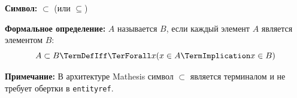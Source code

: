 

\hypertarget{axiom-subset}{}
\begin{object} %



\textbf{Символ:} $\subset$ (или $\subseteq$)

\textbf{Формальное определение:}
 $A$ называется   $B$, если каждый элемент $A$ является элементом $B$:
\[ A \subset B \TermDefIff \TerForall x (x \in A \TermImplication x \in B) \]

\textbf{Примечание:} В архитектуре Mathesis символ $\subset$ является терминалом и не требует обертки в \texttt{entityref}.
\end{object}